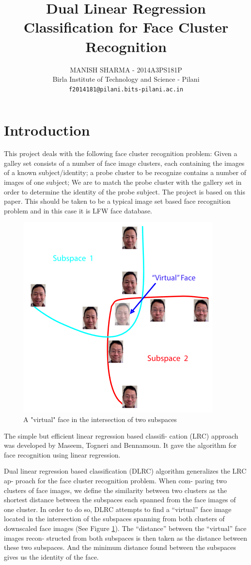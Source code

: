 \documentclass[a4paper]{article}
\title{\textbf{Dual Linear Regression Classification for Face Cluster Recognition}}
\date{}
\author{MANISH SHARMA - 2014A3PS181P\\Birla Institute of Technology and Science - Pilani \\ \texttt{f2014181@pilani.bits-pilani.ac.in}}
\begin{document}
	\maketitle
	\tableofcontents
	
	\section{Introduction}
	This project deals with the following face cluster recognition	problem: Given a galley set consists of a number of
	face image clusters, each containing the images of a known
	subject/identity; a probe cluster to be recognize contains
	a number of images of one subject; We are to match the
	probe cluster with the gallery set in order to determine the
	identity of the probe subject. The project is based on this paper.
	This should be taken to be
	a typical image set based face recognition problem and in this case it is LFW face database.
	
	\begin{figure}
		
			\includegraphics[scale=0.5]{fig1.png}
			\caption{ A "virtual" face in the intersection of two subspaces \label{fig1} }
		
		
	\end{figure}

	The simple but efficient linear regression based classifi-
	cation (LRC) approach was developed by Maseem, Togneri
	and Bennamoun. It gave the algorithm for face recognition using linear regression.

	Dual linear regression based
	classification (DLRC) algorithm generalizes the LRC ap-
	proach for the face cluster recognition problem. When com-
	paring two clusters of face images, we define the similarity
	between two clusters as the shortest distance between the
	subspaces each spanned from the face images of one cluster. In order to do so, DLRC attempts to find a “virtual” face
	image located in the intersection of the subspaces spanning
	from both clusters of downscaled face images (See Figure
	\ref{fig1}). The “distance” between the “virtual” face images recon-
	structed from both subspaces is then taken as the distance
	between these two subspaces. And the minimum distance found between the subspaces gives us the identity of the face.
	
\end{document}
